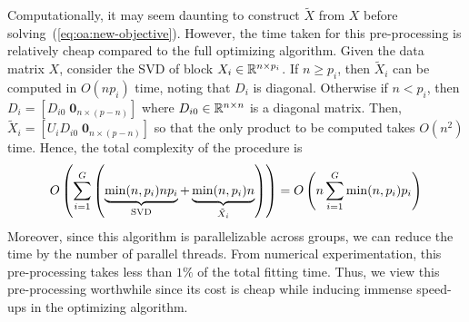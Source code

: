 Computationally, it may seem daunting to 
construct $\tilde{X}$ from $X$ before solving~(\ref{eq:oa:new-objective}).
However, the time taken for this pre-processing is relatively cheap compared to the full optimizing algorithm.
Given the data matrix $X$, consider the SVD of block $X_i \in \mathbb{R}^{n \times p_i}$.
If $n \geq p_i$, then $\tilde{X}_i$ can be computed in $O(n p_i)$ time, noting that $D_i$ is diagonal.
Otherwise if $n < p_i$, then $D_i = [D_{i0} \; \textbf{0}_{n\times (p-n)}]$ where $D_{i0} \in \mathbb{R}^{n \times n}$ is a diagonal matrix.
Then, $\tilde{X}_i = [U_i D_{i0} \; \textbf{0}_{n \times (p-n)}]$ so that the only product to be computed takes $O(n^2)$ time.
Hence, the total complexity of the procedure is
\begin{align*}
    O\left(
        \sum\limits_{i=1}^G
        \left(\underbrace{\min(n,p_i) n p_i}_{\mathrm{SVD}} + \underbrace{\min(n, p_i) n}_{\tilde{X}_i}\right)
    \right)
    =
    O\left(
        n
        \sum\limits_{i=1}^G
        \min(n,p_i) p_i
    \right)
\end{align*}
Moreover, since this algorithm is parallelizable across groups,
we can reduce the time by the number of parallel threads.
From numerical experimentation, this pre-processing takes less than $1\%$ of the total fitting time.
Thus, we view this pre-processing worthwhile since its cost is cheap
while inducing immense speed-ups in the optimizing algorithm.

